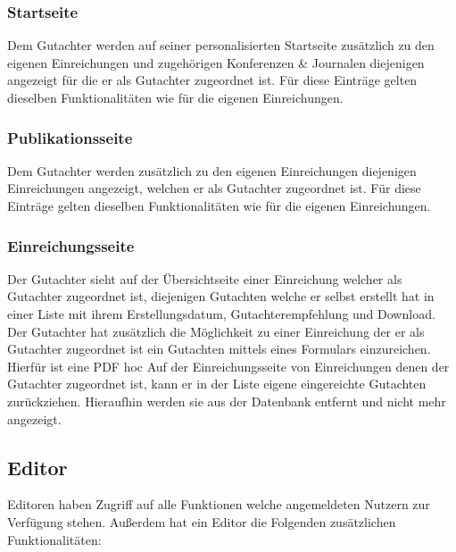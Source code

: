 \subsubsection{Startseite}
\begin{description}
    \XXitem{} Dem Gutachter werden auf seiner personalisierten Startseite zusätzlich zu den eigenen
    Einreichungen und zugehörigen Konferenzen \& Journalen diejenigen angezeigt für die er als Gutachter
    zugeordnet ist.
    Für diese Einträge gelten dieselben Funktionalitäten wie für die eigenen Einreichungen.
\end{description}

\subsubsection{Publikationsseite}
\begin{description}
    \XXitem{} Dem Gutachter werden zusätzlich zu den eigenen Einreichungen diejenigen Einreichungen angezeigt,
    welchen er als Gutachter zugeordnet ist. Für diese Einträge gelten dieselben Funktionalitäten wie für die
    eigenen Einreichungen. %
\end{description}

\subsubsection{Einreichungsseite}
\begin{description}
    \XXitem{} Der Gutachter sieht auf der Übersichtseite einer Einreichung welcher als Gutachter
    zugeordnet ist, diejenigen Gutachten welche er selbst erstellt hat in einer
    Liste mit ihrem Erstellungsdatum, Gutachterempfehlung und Download.
    \XXitem{} Der Gutachter hat zusätzlich die Möglichkeit zu einer Einreichung der er als Gutachter zugeordnet ist
    ein Gutachten mittels eines Formulars einzureichen. Hierfür ist eine PDF hoc
     Auf der Einreichungsseite von Einreichungen denen der Gutachter zugeordnet ist,
    kann er in der Liste eigene eingereichte Gutachten zurückziehen. Hieraufhin werden sie aus
    der Datenbank entfernt und nicht mehr angezeigt.
\end{description}

\subsection{Editor}
Editoren haben Zugriff auf alle Funktionen welche angemeldeten Nutzern zur Verfügung stehen.
Außerdem hat ein Editor die Folgenden zusätzlichen Funktionalitäten:

